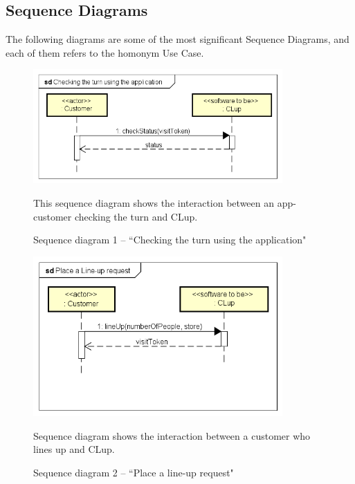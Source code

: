 \documentclass[a4paper,oneside,11pt]{book}   %
\newcommand{\captionrasd}[2]{\caption{#1}\par\begin{center}\vspace{-.01\textheight}\small#2.\end{center}}
\begin{document}
    \newpage
    \subsection{Sequence Diagrams}
    The following diagrams are some of the most significant Sequence Diagrams, and each of them refers to the homonym Use Case. 
    
    \begin{figure}[H]
        \centering
        \includegraphics[width=0.85\textwidth, keepaspectratio]{pictures/sequence_diagrams/check_turn_via_app}
        \captionrasd{Sequence diagram 1 -- ``Checking the turn using the application"}{This sequence diagram shows the interaction between an app-customer checking the turn and CLup}
        
        \label{figure:sequence_diagram_1_check_turn_via_app}
    \end{figure}
    
    \begin{figure}[H]
        \centering
        \includegraphics[width=0.85\textwidth, keepaspectratio]{pictures/sequence_diagrams/place_line-up_request}
        \captionrasd{Sequence diagram 2 -- ``Place a line-up request"}{Sequence diagram shows the interaction between a customer who lines up and CLup}
        \label{figure:sequence_diagram_2_place_lineup_request}
    \end{figure}
    
\end{document}
